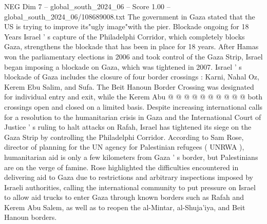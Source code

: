 \begin{textsample}{NEG Dim 7 – global\_south\_2024\_06 – Score 1.00 – global\_south\_2024\_06/108689008.txt}
The government in Gaza stated that the US is trying to improve its"ugly image"with the pier.
Blockade ongoing for 18 Years Israel ' s capture of the Philadelphi Corridor, which completely blocks Gaza, strengthens the blockade that has been in place for 18 years.
After Hamas won the parliamentary elections in 2006 and took control of the Gaza Strip, Israel began imposing a blockade on Gaza, which was tightened in 2007.
Israel ' s blockade of Gaza includes the closure of four border crossings : Karni, Nahal Oz, Kerem Ebu Salim, and Sufa.
The Beit Hanoun Border Crossing was designated for individual entry and exit, while the Kerem Abu @ @ @ @ @ @ @ @ @ @ both crossings open and closed on a limited basis.
Despite increasing international calls for a resolution to the humanitarian crisis in Gaza and the International Court of Justice ' s ruling to halt attacks on Rafah, Israel has tightened its siege on the Gaza Strip by controlling the Philadelphi Corridor.
According to Sam Rose, director of planning for the UN agency for Palestinian refugees ( UNRWA ), humanitarian aid is only a few kilometers from Gaza ' s border, but Palestinians are on the verge of famine.
Rose highlighted the difficulties encountered in delivering aid to Gaza due to restrictions and arbitrary inspections imposed by Israeli authorities, calling the international community to put pressure on Israel to allow aid trucks to enter Gaza through known borders such as Rafah and Kerem Abu Salem, as well as to reopen the al-Mintar, al-Shuja'iya, and Beit Hanoun borders.

\end{textsample}
